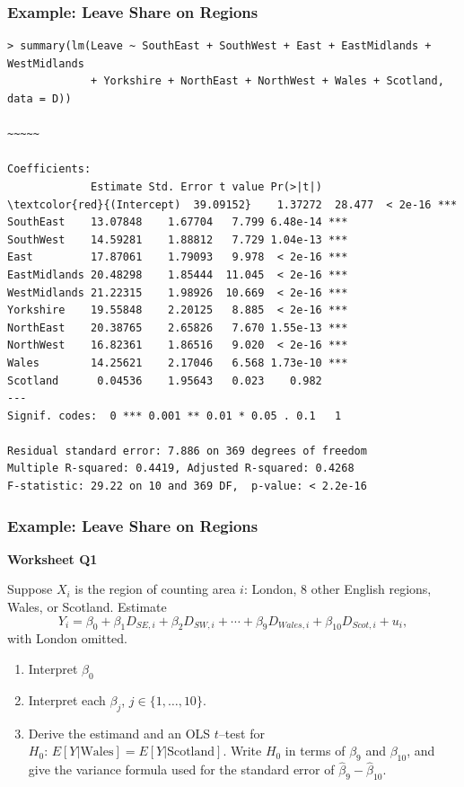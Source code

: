 \documentclass[xcolor=svgnames,9pt,english,aspectratio=169,t]{beamer}
\begin{document}
\begin{frame}[fragile,t]
\frametitle{Example: Leave Share on Regions}
\begin{Verbatim}[fontsize=\scriptsize, frame=single, label=R Code, commandchars=\\\{\}]
> summary(lm(Leave ~ SouthEast + SouthWest + East + EastMidlands + WestMidlands
             + Yorkshire + NorthEast + NorthWest + Wales + Scotland, data = D))

~~~~~

Coefficients:
             Estimate Std. Error t value Pr(>|t|)
\textcolor{red}{(Intercept)  39.09152}    1.37272  28.477  < 2e-16 ***
SouthEast    13.07848    1.67704   7.799 6.48e-14 ***
SouthWest    14.59281    1.88812   7.729 1.04e-13 ***
East         17.87061    1.79093   9.978  < 2e-16 ***
EastMidlands 20.48298    1.85444  11.045  < 2e-16 ***
WestMidlands 21.22315    1.98926  10.669  < 2e-16 ***
Yorkshire    19.55848    2.20125   8.885  < 2e-16 ***
NorthEast    20.38765    2.65826   7.670 1.55e-13 ***
NorthWest    16.82361    1.86516   9.020  < 2e-16 ***
Wales        14.25621    2.17046   6.568 1.73e-10 ***
Scotland      0.04536    1.95643   0.023    0.982
---
Signif. codes:  0 *** 0.001 ** 0.01 * 0.05 . 0.1   1

Residual standard error: 7.886 on 369 degrees of freedom
Multiple R-squared: 0.4419,	Adjusted R-squared: 0.4268
F-statistic: 29.22 on 10 and 369 DF,  p-value: < 2.2e-16
\end{Verbatim}
\end{frame}

\begin{frame}[fragile,t]
\frametitle{Example: Leave Share on Regions}

\textbf{Worksheet Q1}\medskip

Suppose $X_i$ is the region of counting area $i$: London, 8 other English regions, Wales, or Scotland. Estimate
\[
Y_i=\beta_0+\beta_1 D_{SE,i}+\beta_2 D_{SW,i}+\cdots+\beta_9 D_{Wales,i}+\beta_{10} D_{Scot,i}+u_i,
\]
with London omitted.
\begin{enumerate}
    \item Interpret $\beta_0$
    \item Interpret each $\beta_j$, $j\in\{1,\ldots,10\}$.
    \item Derive the estimand and an OLS $t$–test for $H_0:\,E[Y|\text{Wales}]=E[Y|\text{Scotland}]$. Write $H_0$ in terms of $\beta_9$ and $\beta_{10}$, and give the variance formula used for the standard error of $\hat\beta_9-\hat\beta_{10}$.
\end{enumerate}
\end{frame}
\end{document}
